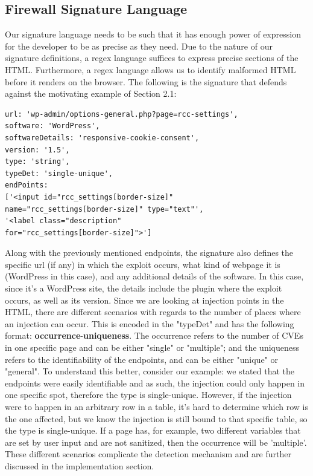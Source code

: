  \subsection{Firewall Signature Language}
 Our signature language needs to be such that it has enough power of expression for the developer to be as precise as they need. Due to the nature of our signature definitions, a regex language suffices to express precise sections of the HTML. Furthermore, a regex language allows us to identify malformed HTML before it renders on the browser. The following is the signature that defends against the motivating example of Section 2.1:
 \lstset{basicstyle=\small}
\begin{lstlisting}
url: 'wp-admin/options-general.php?page=rcc-settings',
software: 'WordPress',
softwareDetails: 'responsive-cookie-consent',
version: '1.5',
type: 'string',
typeDet: 'single-unique',
endPoints: 
['<input id="rcc_settings[border-size]" 
name="rcc_settings[border-size]" type="text"',
'<label class="description" 
for="rcc_settings[border-size]">']
\end{lstlisting}
 
 Along with the previously mentioned endpoints, the signature also defines the specific url (if any) in which the exploit occurs, what kind of webpage it is (WordPress in this case), and any additional details of the software. In this case, since it's a WordPress site, the details include the plugin where the exploit occurs, as well as its version. Since we are looking at injection points in the HTML, there are different scenarios with regards to the number of places where an injection can occur. This is encoded in the "typeDet" and has the following format: \textbf{occurrence}-\textbf{uniqueness}. The occurrence refers to the number of CVEs in one specific page and can be either "single" or "multiple"; and the uniqueness refers to the identifiability of the endpoints, and can be either "unique" or "general". To understand this better, consider our example: we stated that the endpoints were easily identifiable and as such, the injection could only happen in one specific spot, therefore the type is single-unique. However, if the injection were to happen in an arbitrary row in a table, it's hard to determine which row is the one affected, but we know the injection is still bound to that specific table, so the type is single-unique. If a page has, for example, two different variables that are set by user input and are not sanitized, then the occurrence will be 'multiple'. These different scenarios complicate the detection mechanism and are further discussed in the implementation section.
 
